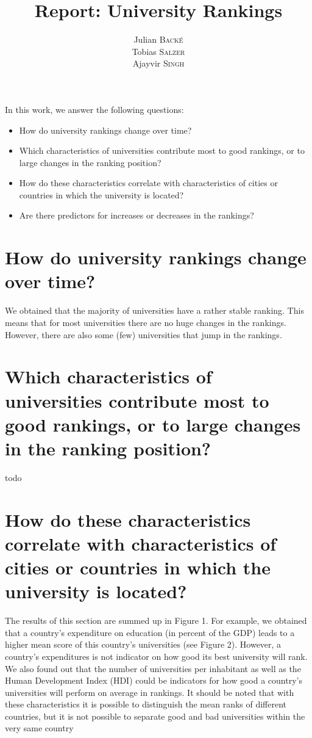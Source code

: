 \documentclass{article}
\title{Report: \textbf{University Rankings}} %
\author{Julian \textsc{Backé} \\ Tobias \textsc{Salzer} \\ Ajayvir \textsc{Singh}} %
\begin{document}
\maketitle %

In this work, we answer the following questions:

\begin{itemize}
	\item How do university rankings change over time? 
	
	\item Which characteristics of universities contribute most to good rankings, or to large changes in the ranking position? 
	
	\item How do these characteristics correlate with characteristics of cities or countries in which the university is located? 
	
	\item Are there predictors for increases or decreases in the rankings?
\end{itemize}

\section*{\large{How do university rankings change over time?}}
We obtained that the majority of universities have a rather stable ranking. This means that for most universities there are no huge changes in the rankings. However, there are also some (few) universities that jump in the rankings.

\section*{\large{Which characteristics of universities contribute most to good rankings, or to large changes in the ranking position?}}
todo

\section*{\large{How do these characteristics correlate with characteristics of cities or countries in which the university is located?}}

The results of this section are summed up in Figure 1. For example, we obtained that a country's expenditure on education (in percent of the GDP) leads to a higher mean score of this country's universities (see Figure 2). However, a country's expenditures is not indicator on how good its best university will rank. We also found out that the number of universities per inhabitant as well as the Human Development Index (HDI) could be indicators for how good a country's universities will perform on average in rankings. It should be noted that with these characteristics it is possible to distinguish the mean ranks of different countries, but it is not possible to separate good and bad universities within the very same country
\end{document}
